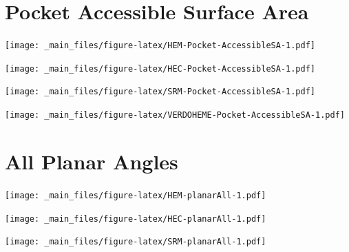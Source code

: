 \documentclass[a4paper, nobind]{templates/ociamthesis}
\let\origfigure\figure
\let\endorigfigure\endfigure
\renewenvironment{figure}[1][2] {
    \expandafter\origfigure\expandafter[H]
} {
    \endorigfigure
}
\begin{document}
\hypertarget{figs-pocketAccSA}{%
\section{Pocket Accessible Surface Area}\label{figs-pocketAccSA}}

\begin{figure}
\centering
\texttt{[image: \_main\_files/figure-latex/HEM-Pocket-AccessibleSA-1.pdf]}
\caption{\label{fig:HEM-Pocket-AccessibleSA}HEM: Pocket Accessible Surface Area}
\end{figure}

\begin{figure}
\centering
\texttt{[image: \_main\_files/figure-latex/HEC-Pocket-AccessibleSA-1.pdf]}
\caption{\label{fig:HEC-Pocket-AccessibleSA}HEC: Pocket Accessible Surface Area}
\end{figure}

\begin{figure}
\centering
\texttt{[image: \_main\_files/figure-latex/SRM-Pocket-AccessibleSA-1.pdf]}
\caption{\label{fig:SRM-Pocket-AccessibleSA}SRM: Pocket Accessible Surface Area}
\end{figure}

\begin{figure}
\centering
\texttt{[image: \_main\_files/figure-latex/VERDOHEME-Pocket-AccessibleSA-1.pdf]}
\caption{\label{fig:VERDOHEME-Pocket-AccessibleSA}VERDOHEME: Pocket Accessible Surface Area}
\end{figure}

\hypertarget{figs-planarAll}{%
\section{All Planar Angles}\label{figs-planarAll}}

\begin{figure}
\centering
\texttt{[image: \_main\_files/figure-latex/HEM-planarAll-1.pdf]}
\caption{\label{fig:HEM-planarAll}HEM: All Planar Angles}
\end{figure}

\begin{figure}
\centering
\texttt{[image: \_main\_files/figure-latex/HEC-planarAll-1.pdf]}
\caption{\label{fig:HEC-planarAll}HEC: All Planar Angles}
\end{figure}

\begin{figure}
\centering
\texttt{[image: \_main\_files/figure-latex/SRM-planarAll-1.pdf]}
\caption{\label{fig:SRM-planarAll}SRM: All Planar Angles}
\end{figure}
\end{document}
